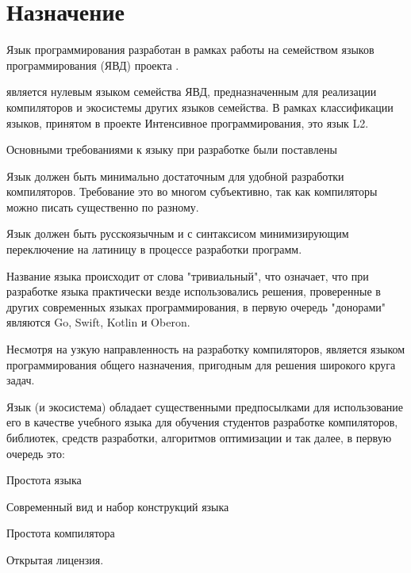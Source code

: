 \hypertarget{target}{
\section{Назначение}\label{target:chapter}}

Язык программирования \thelang{} разработан в рамках работы на семейством языков программирования \href{http://алексейнедоря.рф/?p=419}{}  (ЯВД)  проекта \href{http://digital-economy.ru/stati/интенсивное-программирование}{}.

\thelang{} является нулевым языком семейства ЯВД, предназначенным для реализации компиляторов и экосистемы других языков семейства. В рамках классификации языков, принятом в проекте Интенсивное программирования, это язык L2.


Основными требованиями к языку при разработке были поставлены
\begin{d_itemize}
\item 
    Язык должен быть минимально достаточным для удобной разработки компиляторов. Требование это во многом субъективно, так как компиляторы можно писать существенно по разному.
\item 
    Язык должен быть русскоязычным и с синтаксисом минимизирующим переключение на латиницу в процессе разработки программ.
\end{d_itemize}

Название языка происходит от слова "тривиальный", что означает, что при разработке языка практически везде использовались решения, проверенные в других современных языках программирования, в первую очередь "донорами" являются Go, Swift, Kotlin и Oberon.

Несмотря на узкую направленность на разработку компиляторов, \thelang{} является языком программирования общего назначения, пригодным для решения широкого круга задач.

Язык (и экосистема) обладает существенными предпосылками для использование его в качестве учебного языка для обучения студентов разработке компиляторов, библиотек, средств разработки, алгоритмов оптимизации и так далее, в первую очередь это:
\begin{d_itemize}
\item 
    Простота языка
\item 
    Современный вид и набор конструкций языка
\item 
    Простота компилятора
\item 
    Открытая лицензия.
\end{d_itemize}

